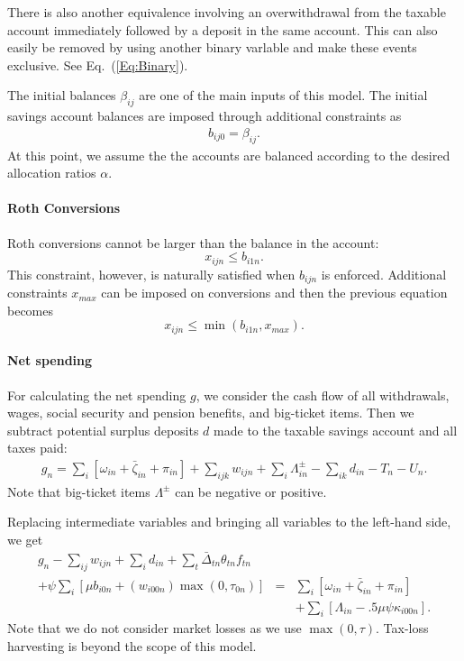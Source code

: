 \documentclass{report}[fleqn,12pt]
\begin{document}
	There is also another equivalence involving an overwithdrawal from the taxable
	account immediately followed by a deposit in the same account. This can also easily
	be removed by using another binary varlable and make these events exclusive.
	See Eq.~(\ref{Eq:Binary}).

	The initial balances $\beta_{ij}$ are one of the main inputs of this model.
	The initial savings account balances are imposed through additional constraints as
	\begin{eqnarray}
		\label{Eq:InitialBalance}
		b_{ij0} = \beta_{ij}.
	\end{eqnarray}
	At this point, we assume the the accounts are balanced according to the desired
	allocation ratios $\alpha$.

\paragraph*{Roth Conversions}
	Roth conversions cannot be larger than the balance in the account:
	\begin{equation}
		x_{ijn} \le b_{i1n}.
	\end{equation}
	This constraint, however, is naturally satisfied when $b_{ijn}$ is enforced.
	Additional constraints $x_{max}$ can be imposed on conversions and then the previous equation
	becomes
	\begin{equation}
		x_{ijn} \le \min(b_{i1n}, x_{max}).
	\end{equation}

\paragraph*{Net spending}
	For calculating the net spending $g$, we consider the cash flow of all withdrawals,
	wages, social security and pension benefits, and big-ticket items. 
	Then we subtract potential surplus deposits $d$ made to the taxable savings account
	and all taxes paid:
	\begin{eqnarray}
		g_n = \sum_i [\omega_{in} + \bar{\zeta}_{in} + \pi_{in} ] 
		+ \sum_{ijk} w_{ijn} + \sum_i \Lambda^\pm_{in} - \sum_{ik}d_{in}
		- T_n - U_n.
	\end{eqnarray}
	Note that big-ticket items $\Lambda^\pm$ can be negative or positive.

	Replacing intermediate variables and bringing all variables to the left-hand side, we get
	\begin{eqnarray}
		\label{Eq:C4}
		g_n - \sum_{ij} w_{ijn} + \sum_{i}d_{in}
		+ \sum_t \bar{\Delta}_{t n}\theta_{t n} f_{t n}&&\nonumber \\
		+ \psi \sum_{i} \left[\mu b_{i0n} + (w_{i00n})
		\max(0, \tau_{0n})\right] 
		&= & \sum_i [\omega_{in} + \bar{\zeta}_{in} + \pi_{in} ] \nonumber\\
		&& + \sum_i [\Lambda_{in} - .5\mu\psi\kappa_{i00n}].
	\end{eqnarray}
	Note that we do not consider market losses as we use $\max(0, \tau)$. Tax-loss
	harvesting is beyond the scope of this model.
\end{document}
